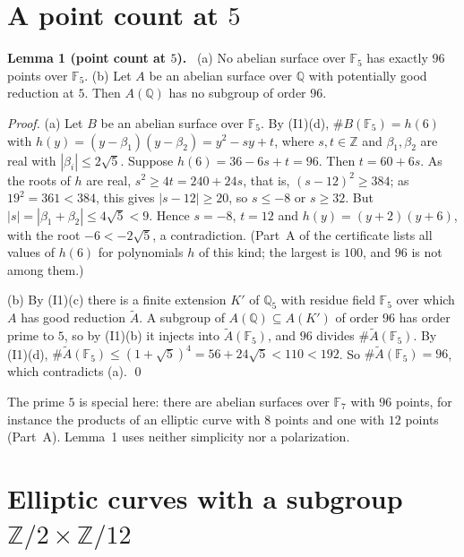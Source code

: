 \documentclass[11pt]{article}
\newenvironment{statement}[1]{\par\medskip\noindent\phantomsection\textbf{#1}\ }{\par\medskip}
\newcommand{\Q}{\mathbb Q}
\newcommand{\Z}{\mathbb Z}
\newcommand{\F}{\mathbb F}
\begin{document}
\section{A point count at \(5\)}\label{five}

\begin{statement}{Lemma 1 (point count at \(5\)).}\label{lemma-five}
(a) No abelian surface over \(\F_5\) has exactly \(96\) points over \(\F_5\).
(b) Let \(A\) be an abelian surface over \(\Q\) with potentially good reduction at \(5\). Then \(A(\Q)\) has no
subgroup of order \(96\).
\end{statement}

\emph{Proof.} (a) Let \(B\) be an abelian surface over \(\F_5\). By (I1)(d), \(\#B(\F_5)=h(6)\) with
\(h(y)=(y-\beta_1)(y-\beta_2)=y^2-sy+t\), where \(s,t\in\Z\) and \(\beta_1,\beta_2\) are real with
\(|\beta_i|\le2\sqrt5\). Suppose \(h(6)=36-6s+t=96\). Then \(t=60+6s\). As the roots of \(h\) are real,
\(s^2\ge4t=240+24s\), that is, \((s-12)^2\ge384\); as \(19^2=361<384\), this gives \(|s-12|\ge20\), so
\(s\le-8\) or \(s\ge32\). But \(|s|=|\beta_1+\beta_2|\le4\sqrt5<9\). Hence \(s=-8\), \(t=12\) and
\(h(y)=(y+2)(y+6)\), with the root \(-6<-2\sqrt5\), a contradiction. (Part~A of the certificate lists all values
of \(h(6)\) for polynomials \(h\) of this kind; the largest is \(100\), and \(96\) is not among them.)

(b) By (I1)(c) there is a finite extension \(K'\) of \(\Q_5\) with residue field \(\F_5\) over which \(A\) has good
reduction \(\widetilde A\). A subgroup of \(A(\Q)\subseteq A(K')\) of order \(96\) has order prime to \(5\), so by
(I1)(b) it injects into \(\widetilde A(\F_5)\), and \(96\) divides \(\#\widetilde A(\F_5)\). By (I1)(d),
\(\#\widetilde A(\F_5)\le(1+\sqrt5)^4=56+24\sqrt5<110<192\). So \(\#\widetilde A(\F_5)=96\), which contradicts
(a). \qed

\medskip
The prime \(5\) is special here: there are abelian surfaces over \(\F_7\) with \(96\) points, for instance the
products of an elliptic curve with \(8\) points and one with \(12\) points (Part~A). Lemma~1 uses neither
simplicity nor a polarization.

\section{Elliptic curves with a subgroup \(\Z/2\times\Z/12\)}\label{curves}
\end{document}
